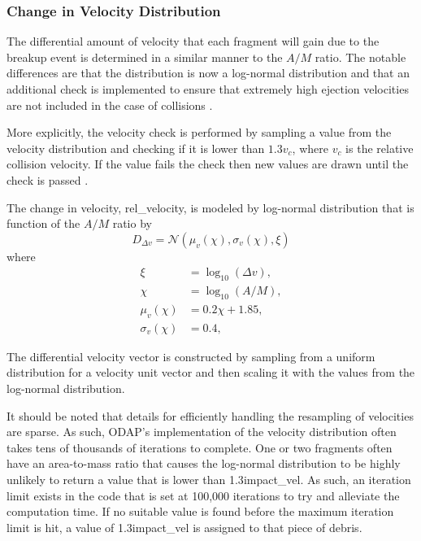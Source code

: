 \documentclass[a4paper, 12pt]{article}
\begin{document}
\subsubsection{Change in Velocity Distribution }
The differential amount of velocity that each fragment will gain due to the breakup event is determined in a similar manner to the $A/M$ ratio. The notable differences are that the distribution is now a log-normal distribution and that an additional check is implemented to ensure that extremely high ejection velocities are not included in the case of collisions \citep{letizia_space_2016}. 

More explicitly, the velocity check is performed by sampling a value from the velocity distribution and checking if it is lower than $1.3v_c$, where $v_c$ is the relative collision velocity. If the value fails the check then new values are drawn until the check is passed \citep{letizia_space_2016}.

The change in velocity, \Gls{rel_velocity}, is modeled by log-normal distribution that is function of the $A/M$ ratio by
\begin{equation}
	D_{\Delta v}= \mathcal{N}(\mu_{v}(\chi), \sigma_{v}(\chi), \xi)
\end{equation}
\noindent where \begin{align}
	\xi &= \log_{10}(\Delta v),\\
	\chi &= \log_{10}(A/M),\\
	\mu_{v}(\chi) &= 0.2\chi+1.85,\\
	 \sigma_{v}(\chi) &= 0.4,
\end{align}

The differential velocity vector is constructed by sampling from a uniform distribution for a velocity unit vector and then scaling it with the values from the log-normal distribution. 

It should be noted that details for efficiently handling the resampling of velocities are sparse. As such, ODAP's implementation of the velocity distribution often takes tens of thousands of iterations to complete. One or two fragments often have an area-to-mass ratio that causes the log-normal distribution to be highly unlikely to return a value that is lower than 1.3\Gls{impact_vel}. As such, an iteration limit exists in the code that is set at 100,000 iterations to try and alleviate the computation time. If no suitable value is found before the maximum iteration limit is hit, a value of 1.3\Gls{impact_vel} is assigned to that piece of debris.
\end{document}
